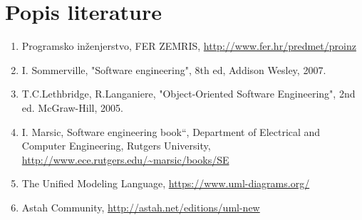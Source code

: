 \chapter*{Popis literature}

\begin{enumerate}


	\item  Programsko inženjerstvo, FER ZEMRIS, \url{http://www.fer.hr/predmet/proinz}

	\item  I. Sommerville, "Software engineering", 8th ed, Addison Wesley, 2007.

	\item  T.C.Lethbridge, R.Langaniere, "Object-Oriented Software Engineering", 2nd ed. McGraw-Hill, 2005.

	\item  I. Marsic, Software engineering book``, Department of Electrical and Computer Engineering, Rutgers University, \url{http://www.ece.rutgers.edu/~marsic/books/SE}

	\item  The Unified Modeling Language, \url{https://www.uml-diagrams.org/}

	\item  Astah Community, \url{http://astah.net/editions/uml-new}
\end{enumerate}

